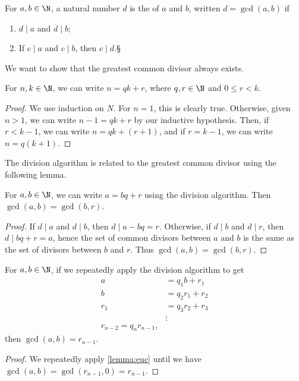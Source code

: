 \documentclass[a4paper]{scrreprt}
\begin{document}
\begin{definition}
	For $a, b \in \N$, a natural number $d$ is the  of $a$ and $b$, written $d = \gcd(a, b)$ if
	\begin{enumerate}[label=(\roman*)]
		\item $d \mid a$ and $d \mid b$;
		\item If $c \mid a$ and $c \mid b$, then $c \mid d$.§
	\end{enumerate}
\end{definition}

We want to show that the greatest common divisor always exists.

\begin{proposition}
	For $n, k \in \N$, we can write $n = qk + r$, where $q, r \in \N$ and $0 \leq r < k$.
\end{proposition}
\begin{proof}
	We use induction on $N$. For $n = 1$, this is clearly true. Otherwise, given $n > 1$, we can write $n - 1 = qk + r$ by our inductive hypothesis. Then, if $r < k - 1$, we can write $n = qk + (r + 1)$, and if $r = k - 1$, we can write $n = q(k + 1)$.
\end{proof}

The division algorithm is related to the greatest common divisor using the following lemma.

\begin{lemma}[Euclid]\label{lemma:euc}
	For $a, b \in \N$, we can write $a = bq + r$ using the division algorithm. Then $\gcd(a, b) = \gcd(b, r)$.
\end{lemma}
\begin{proof}
	If $d \mid a$ and $d \mid b$, then $d \mid a - bq = r$.
	Otherwise, if $d \mid b$ and $d \mid r$, then $d \mid bq + r = a$, hence the set of common divisors between $a$ and $b$ is the same as the set of divisors between $b$ and $r$. Thus $\gcd(a, b) = \gcd(b, r)$.
\end{proof}

\begin{theorem}
	For $a, b \in \N$, if we repeatedly apply the division algorithm to get
	\begin{align*}
		a &= q_1 b + r_1 \\
		b &= q_2 r_1 + r_2 \\
		r_1 &= q_3 r_2 + r_3 \\
		&\vdots \\
		r_{n - 2} = q_n r_{n - 1},
	\end{align*}
	then $\gcd(a, b) = r_{n - 1}$.
\end{theorem}
\begin{proof}
	We repeatedly apply \autoref{lemma:euc} until we have $\gcd(a, b) = \gcd(r_{n - 1}, 0) = r_{n - 1}$.
\end{proof}
\end{document}
